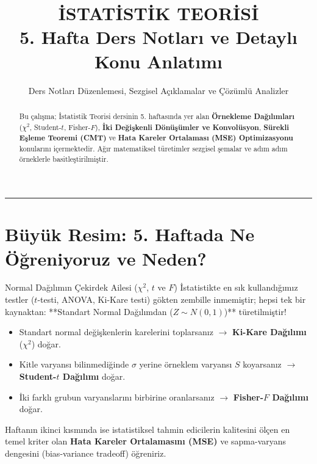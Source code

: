 \documentclass[12pt,a4paper]{article}
\title{\textbf{İSTATİSTİK TEORİSİ}\\[0.3em] \Large 5. Hafta Ders Notları ve Detaylı Konu Anlatımı}
\author{Ders Notları Düzenlemesi, Sezgisel Açıklamalar ve Çözümlü Analizler}
\date{}
\begin{document}
\maketitle

\begin{abstract}
Bu çalışma; İstatistik Teorisi dersinin 5. haftasında yer alan \textbf{Örnekleme Dağılımları} ($\chi^2$, Student-$t$, Fisher-$F$), \textbf{İki Değişkenli Dönüşümler ve Konvolüsyon}, \textbf{Sürekli Eşleme Teoremi (CMT)} ve \textbf{Hata Kareler Ortalaması (MSE) Optimizasyonu} konularını içermektedir. Ağır matematiksel türetimler sezgisel şemalar ve adım adım örneklerle basitleştirilmiştir.
\end{abstract}

\hrule
\vspace{1em}

\section{Büyük Resim: 5. Haftada Ne Öğreniyoruz ve Neden?}

\begin{sezgi}{Normal Dağılımın Çekirdek Ailesi ($\chi^2$, $t$ ve $F$)}
İstatistikte en sık kullandığımız testler ($t$-testi, ANOVA, Ki-Kare testi) gökten zembille inmemiştir; hepsi tek bir kaynaktan: **Standart Normal Dağılımdan ($Z \sim N(0,1)$)** türetilmiştir!
\begin{itemize}
    \item Standart normal değişkenlerin karelerini toplarsanız $\longrightarrow$ \textbf{Ki-Kare Dağılımı} ($\chi^2$) doğar.
    \item Kitle varyansı bilinmediğinde $\sigma$ yerine örneklem varyansı $S$ koyarsanız $\longrightarrow$ \textbf{Student-$t$ Dağılımı} doğar.
    \item İki farklı grubun varyanslarını birbirine oranlarsanız $\longrightarrow$ \textbf{Fisher-$F$ Dağılımı} doğar.
\end{itemize}
Haftanın ikinci kısmında ise istatistiksel tahmin edicilerin kalitesini ölçen en temel kriter olan \textbf{Hata Kareler Ortalamasını (MSE)} ve sapma-varyans dengesini (bias-variance tradeoff) öğreniriz.
\end{sezgi}
\end{document}
